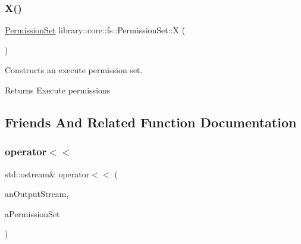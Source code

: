 \subsubsection{\texorpdfstring{X()}{X()}}
{\footnotesize\ttfamily \mbox{\hyperlink{classlibrary_1_1core_1_1fs_1_1_permission_set}{Permission\+Set}} library\+::core\+::fs\+::\+Permission\+Set\+::X (\begin{DoxyParamCaption}{ }\end{DoxyParamCaption})\hspace{0.3cm}{\ttfamily [static]}}



Constructs an execute permission set. 


\begin{DoxyCode}{0}
\end{DoxyCode}


\begin{DoxyReturn}{Returns}
Execute permissions 
\end{DoxyReturn}


\subsection{Friends And Related Function Documentation}
\mbox{\label{classlibrary_1_1core_1_1fs_1_1_permission_set_a8f2d68bb94d86dea76869abe148ea9f3}} 
\subsubsection{\texorpdfstring{operator$<$$<$}{operator<<}}
{\footnotesize\ttfamily std\+::ostream\& operator$<$$<$ (\begin{DoxyParamCaption}\item[{std\+::ostream \&}]{an\+Output\+Stream,  }\item[{const \mbox{\hyperlink{classlibrary_1_1core_1_1fs_1_1_permission_set}{Permission\+Set}} \&}]{a\+Permission\+Set }\end{DoxyParamCaption})\hspace{0.3cm}{\ttfamily [friend]}}



